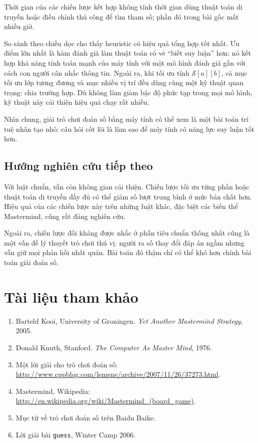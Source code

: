 \documentclass[11pt]{article}
\newcommand{\SetS}{\mathcal{S}}
\begin{document}
Thời gian của các chiến lược kết hợp không tính thời gian dùng thuật toán di
truyền hoặc điều chỉnh thủ công để tìm tham số; phần đó trong bài gốc mất
nhiều giờ.

So sánh theo chiều dọc cho thấy heuristic có hiệu quả tổng hợp tốt nhất. Ưu
điểm lớn nhất là hàm đánh giá làm thuật toán có vẻ ``biết suy luận'' hơn: nó
kết hợp khả năng tính toán mạnh của máy tính với một mô hình đánh giá gần với
cách con người cân nhắc thông tin. Ngoài ra, khi tối ưu tính
\(\SetS[a][b]\), cả mục tối ưu lớp tương đương và mục nhiều vị trí đều dùng
cùng một kỹ thuật quan trọng: chia trường hợp. Dù không làm giảm bậc độ phức
tạp trong mọi mô hình, kỹ thuật này cải thiện hiệu quả chạy rất nhiều.

Nhìn chung, giải trò chơi đoán số bằng máy tính có thể xem là một bài toán trí
tuệ nhân tạo nhỏ: câu hỏi cốt lõi là làm sao để máy tính có năng lực suy luận
tốt hơn.

\subsection{Hướng nghiên cứu tiếp theo}

Với luật chuẩn, vẫn còn không gian cải thiện. Chiến lược tối ưu từng phần hoặc
thuật toán di truyền đầy đủ có thể giảm số lượt trung bình ở mức bản chất hơn.
Hiệu quả của các chiến lược này trên những luật khác, đặc biệt các biến thể
Mastermind, cũng rất đáng nghiên cứu.

Ngoài ra, chiến lược đối kháng được nhắc ở phần tiêu chuẩn thống nhất cũng là
một vấn đề lý thuyết trò chơi thú vị: người ra số thay đổi đáp án ngầm nhưng
vẫn giữ mọi phản hồi nhất quán. Bài toán đó thậm chí có thể khó hơn chính bài
toán giải đoán số.

\section{Tài liệu tham khảo}

\begin{enumerate}
  \item Barteld Kooi, University of Groningen. \textit{Yet Another Mastermind
  Strategy}, 2005.
  \item Donald Knuth, Stanford. \textit{The Computer As Master Mind}, 1976.
  \item Một lời giải cho trò chơi đoán số:
  \url{http://www.cppblog.com/lemene/archive/2007/11/26/37273.html}.
  \item Mastermind, Wikipedia:
  \url{http://en.wikipedia.org/wiki/Mastermind_(board_game)}.
  \item Mục từ về trò chơi đoán số trên Baidu Baike.
  \item Lời giải bài \texttt{guess}, Winter Camp 2006.
\end{enumerate}
\end{document}
